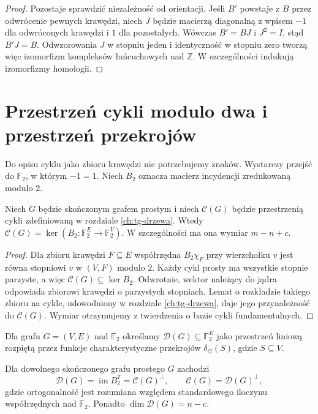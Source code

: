 \begin{proof}
Pozostaje sprawdzić niezależność od orientacji.
Jeśli $B'$ powstaje z $B$ przez odwrócenie pewnych
krawędzi, niech $J$ będzie macierzą diagonalną
z wpisem $-1$ dla odwróconych krawędzi i $1$
dla pozostałych. Wówczas $B'=BJ$ i $J^2=I$,
stąd $B'J=B$. Odwzorowania $J$ w stopniu jeden
i identyczność w stopniu zero tworzą więc
izomorfizm kompleksów łańcuchowych nad $\mathbb Z$.
W szczególności indukują izomorfizmy homologii.
\end{proof}

\section{Przestrzeń cykli modulo dwa i przestrzeń przekrojów}
\label{sec:tg-cut-cycle}

Do opisu cyklu jako zbioru krawędzi nie potrzebujemy znaków.
Wystarczy przejść do $\mathbb F_2$, w którym $-1=1$.
Niech $B_2$ oznacza macierz incydencji zredukowaną modulo $2$.

\begin{stwierdzenie}
Niech $G$ będzie skończonym grafem prostym i niech
$\mathcal C(G)$ będzie przestrzenią cykli zdefiniowaną
w rozdziale \ref{ch:tg-drzewa}. Wtedy
$\mathcal C(G)=\ker(B_2:\mathbb F_2^E\to\mathbb F_2^V)$.
W szczególności ma ona wymiar $m-n+c$.
\end{stwierdzenie}

\begin{proof}
Dla zbioru krawędzi $F\subseteq E$ współrzędna
$B_2\chi_F$ przy wierzchołku $v$ jest równa
stopniowi $v$ w $(V,F)$ modulo $2$.
Każdy cykl prosty ma wszystkie stopnie parzyste, a więc
$\mathcal C(G)\subseteq\ker B_2$.
Odwrotnie, wektor należący do jądra odpowiada zbiorowi
krawędzi o parzystych stopniach. Lemat o rozkładzie takiego
zbioru na cykle, udowodniony w rozdziale
\ref{ch:tg-drzewa}, daje jego przynależność do
$\mathcal C(G)$. Wymiar otrzymujemy z twierdzenia
o bazie cykli fundamentalnych.
\end{proof}

\begin{definicja}
Dla grafu $G=(V,E)$ nad $\mathbb F_2$ określamy
$\mathcal D(G)\subseteq\mathbb F_2^E$ jako przestrzeń
liniową rozpiętą przez funkcje charakterystyczne
przekrojów $\delta_G(S)$, gdzie $S\subseteq V$.
\end{definicja}

\begin{twierdzenie}
\label{thm:tg-orthogonal}
Dla dowolnego skończonego grafu prostego $G$ zachodzi
\[
\mathcal D(G)=\operatorname{im}B_2^T
  =\mathcal C(G)^\perp,\qquad
\mathcal C(G)=\mathcal D(G)^\perp,
\]
gdzie ortogonalność jest rozumiana względem
standardowego iloczynu współrzędnych nad $\mathbb F_2$.
Ponadto $\dim\mathcal D(G)=n-c$.
\end{twierdzenie}

